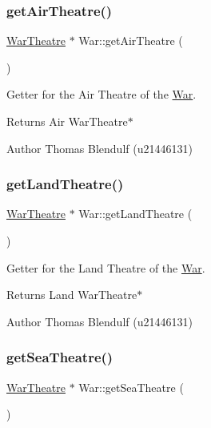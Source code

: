 \subsubsection{\texorpdfstring{getAirTheatre()}{getAirTheatre()}}
{\footnotesize\ttfamily \mbox{\hyperlink{class_war_theatre}{War\+Theatre}} $\ast$ War\+::get\+Air\+Theatre (\begin{DoxyParamCaption}{ }\end{DoxyParamCaption})}



Getter for the Air Theatre of the \mbox{\hyperlink{class_war}{War}}. 

\begin{DoxyReturn}{Returns}
Air War\+Theatre$\ast$ 
\end{DoxyReturn}
\begin{DoxyAuthor}{Author}
Thomas Blendulf (u21446131) 
\end{DoxyAuthor}
\mbox{\label{class_war_aea332c2abc668d6d70744cdb52546bae}} 
\subsubsection{\texorpdfstring{getLandTheatre()}{getLandTheatre()}}
{\footnotesize\ttfamily \mbox{\hyperlink{class_war_theatre}{War\+Theatre}} $\ast$ War\+::get\+Land\+Theatre (\begin{DoxyParamCaption}{ }\end{DoxyParamCaption})}



Getter for the Land Theatre of the \mbox{\hyperlink{class_war}{War}}. 

\begin{DoxyReturn}{Returns}
Land War\+Theatre$\ast$ 
\end{DoxyReturn}
\begin{DoxyAuthor}{Author}
Thomas Blendulf (u21446131) 
\end{DoxyAuthor}
\mbox{\label{class_war_a603fd07ee9a93d2908e12c1d5d06bfa4}} 
\subsubsection{\texorpdfstring{getSeaTheatre()}{getSeaTheatre()}}
{\footnotesize\ttfamily \mbox{\hyperlink{class_war_theatre}{War\+Theatre}} $\ast$ War\+::get\+Sea\+Theatre (\begin{DoxyParamCaption}{ }\end{DoxyParamCaption})}



